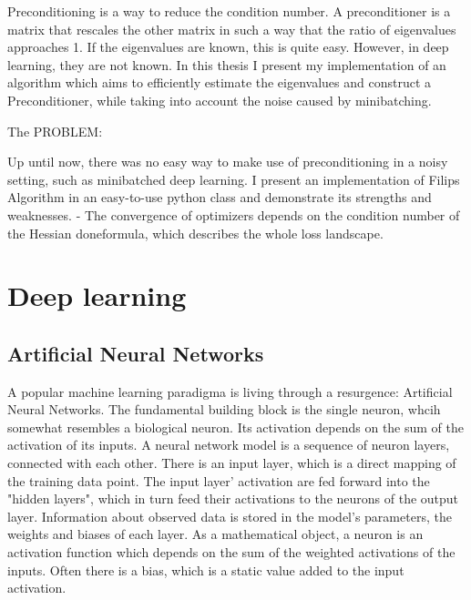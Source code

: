 \documentclass[twoside,12pt,a4paper]{report}
\begin{document}
Preconditioning is a way to reduce the condition number. A preconditioner is a matrix that rescales the other matrix in such a way that the ratio of eigenvalues approaches 1.
If the eigenvalues are known, this is quite easy. However, in deep learning, they are not known. In this thesis I present my implementation of an algorithm which aims to efficiently estimate the eigenvalues and construct a Preconditioner, while taking into account the noise caused by minibatching.


The PROBLEM:

Up until now, there was no easy way to make use of preconditioning in a noisy setting, such as minibatched deep learning. I present an implementation of Filips Algorithm in an easy-to-use python class and demonstrate its strengths and weaknesses.
- The convergence of optimizers depends on the condition number of the Hessian done{formula}, which describes the whole loss landscape.

\section{Deep learning}
\subsection{Artificial Neural Networks}
A popular machine learning paradigma is living through a resurgence: Artificial Neural Networks. The fundamental building block is the single neuron, whcih somewhat resembles a biological neuron. Its activation depends on the sum of the activation of its inputs. A neural network model is a sequence of neuron layers, connected with each other. There is an input layer, which is a direct mapping of the training data point. The input layer' activation are fed forward into the "hidden layers", which in turn feed their activations to the neurons of the output layer. Information about observed data is stored in the model's parameters, the weights and biases of each layer.
As a mathematical object, a neuron is an activation function which depends on the sum of the weighted activations of the inputs. Often there is a bias, which is a static value added to the input activation.
\end{document}
